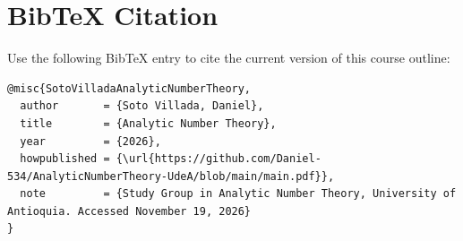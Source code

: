 \documentclass[11pt]{article}
\theoremstyle{definition}
\begin{document}

\clearpage
{}
{}


\clearpage
\section*{BibTeX Citation}
Use the following BibTeX entry to cite the current version of this course outline:
\begin{verbatim}
@misc{SotoVilladaAnalyticNumberTheory,
  author       = {Soto Villada, Daniel},
  title        = {Analytic Number Theory},
  year         = {2026},
  howpublished = {\url{https://github.com/Daniel-534/AnalyticNumberTheory-UdeA/blob/main/main.pdf}},
  note         = {Study Group in Analytic Number Theory, University of Antioquia. Accessed November 19, 2026}
}
\end{verbatim}
\end{document}
